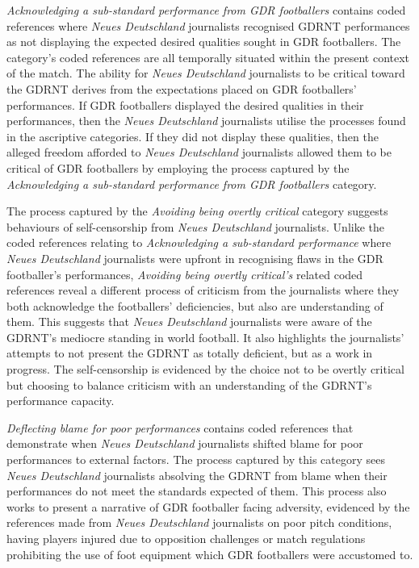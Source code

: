 \textit{Acknowledging a sub-standard performance from GDR footballers} contains coded references where \textit{Neues Deutschland} journalists recognised GDRNT performances as not displaying the expected desired qualities sought in GDR footballers. The category’s coded references are all temporally situated within the present context of the match. The ability for \textit{Neues Deutschland} journalists to be critical toward the GDRNT derives from the expectations placed on GDR footballers’ performances. If GDR footballers displayed the desired qualities in their performances, then the \textit{Neues Deutschland} journalists utilise the processes found in the ascriptive categories. If they did not display these qualities, then the alleged freedom afforded to \textit{Neues Deutschland} journalists allowed them to be critical of GDR footballers by employing the process captured by the \textit{Acknowledging a sub-standard performance from GDR footballers} category.

The process captured by the \textit{Avoiding being overtly critical} category suggests behaviours of self-censorship from \textit{Neues Deutschland} journalists. Unlike the coded references relating to \textit{Acknowledging a sub-standard performance} where \textit{Neues Deutschland} journalists were upfront in recognising flaws in the GDR footballer’s performances, \textit{Avoiding being overtly critical’s} related coded references reveal a different process of criticism from the journalists where they both acknowledge the footballers’ deficiencies, but also are understanding of them. This suggests that \textit{Neues Deutschland} journalists were aware of the GDRNT’s mediocre standing in world football. It also highlights the journalists’ attempts to not present the GDRNT as totally deficient, but as a work in progress. The self-censorship is evidenced by the choice not to be overtly critical but choosing to balance criticism with an understanding of the GDRNT’s performance capacity. 

\textit{Deflecting blame for poor performances} contains coded references that demonstrate when \textit{Neues Deutschland} journalists shifted blame for poor performances to external factors. The process captured by this category sees \textit{Neues Deutschland} journalists absolving the GDRNT from blame when their performances do not meet the standards expected of them. This process also works to present a narrative of GDR footballer facing adversity, evidenced by the references made from \textit{Neues Deutschland} journalists on poor pitch conditions, having players injured due to opposition challenges or match regulations prohibiting the use of foot equipment which GDR footballers were accustomed to.

